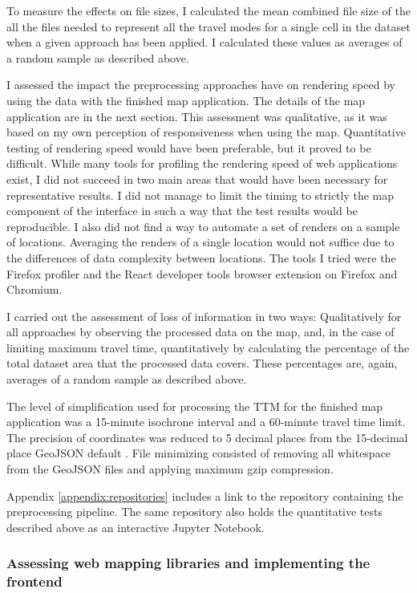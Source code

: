 To measure the effects on file sizes,
I calculated the mean combined file size of the all the files needed to represent
all the travel modes for a single cell in the dataset
when a given approach has been applied.
I calculated these values as averages of a random sample as described above.

I assessed the impact the preprocessing approaches have on rendering speed
by using the data with the finished map application.
The details of the map application are in the next section.
This assessment was qualitative,
as it was based on my own perception of responsiveness when using the map.
Quantitative testing of rendering speed would have been preferable,
but it proved to be difficult.
While many tools for profiling the rendering speed of web applications exist,
I did not succeed in two main areas
that would have been necessary for representative results.
I did not manage to limit the timing to strictly the map
component of the interface in such a way that
the test results would be reproducible.
I also did not find a way to automate a set of renders
on a sample of locations.
Averaging the renders of a single location would not suffice
due to the differences of data complexity between locations.
The tools I tried were the Firefox profiler \parencite{firefoxprofiler}
and the React developer tools browser extension \parencite{reactdevtools}
on Firefox and Chromium. %

I carried out the assessment of loss of information in two ways:
Qualitatively for all approaches by observing the processed data on the map,
and, in the case of limiting maximum travel time,
quantitatively by calculating the percentage of the total dataset area
that the processed data covers.
These percentages are, again, averages of a random sample as described above.

The level of simplification used for
processing the TTM for the finished map application was
a 15-minute isochrone interval and a 60-minute travel time limit.
The precision of coordinates was reduced to 5 decimal places
from the 15-decimal place GeoJSON default \parencite{geojsonspec}.
File minimizing consisted of removing all whitespace from the GeoJSON files
and applying maximum gzip compression.

Appendix \ref{appendix:repositories} includes a link to the repository
containing the preprocessing pipeline.
The same repository also holds the quantitative tests described above
as an interactive Jupyter Notebook.


\subsubsection{Assessing web mapping libraries and implementing the frontend}

